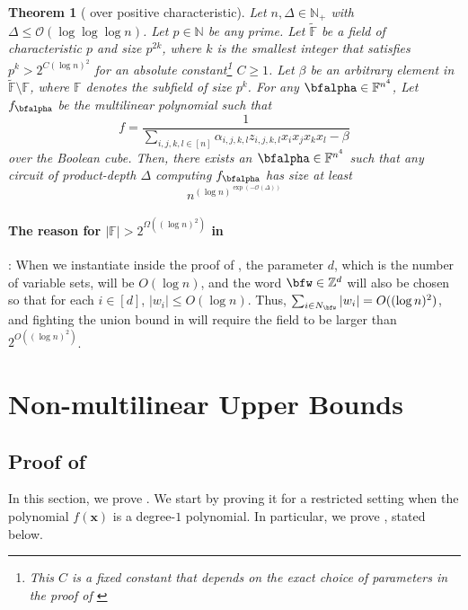 \documentclass[11pt]{article}
\newtheorem{theorem}{Theorem}[section]
\newcommand{\F}{\mathbb{F}}
\begin{document}
\begin{theorem}[\cite{GHT} over positive characteristic]\label{thm: ght positive char}
Let $n, \Delta \in \mathbb{N}_{+}$ with $\Delta \leq \mathcal{O}(\log\log\log n)$. Let $p\in \mathbb{N}$ be any prime. Let $\tilde{\F}$ be a field of characteristic $p$ and size $p^{2k}$, where $k$ is the smallest integer that satisfies $p^k > 2^{C(\log n)^2}$ for an absolute constant\footnote{This $C$ is a fixed constant that depends on the exact choice of parameters in the proof of \cite{GHT}} $C\geq1$. Let $\beta$ be an arbitrary element in $\tilde{\F}\setminus\F$, where $\F$ denotes the subfield of size $p^k$. For any $\bfalpha \in \F^{n^4}$, Let $f_{\bfalpha}$ be the multilinear polynomial such that $$ f = \frac{1}{\sum_{i,j,k,l\in[n]}\alpha_{i,j,k,l}z_{i,j,k,l}x_ix_jx_kx_l - \beta}$$
over the Boolean cube. Then, there exists an $\bfalpha \in \F^{n^4}$ such that any circuit of product-depth $\Delta$ computing $f_{\bfalpha}$ has size at least $$n^{(\log n)^{\exp(-\mathcal{O}(\Delta))}}$$    
\end{theorem}
\paragraph{The reason for $|\F|>2^{\Omega((\log n)^2)}$ in }: When we instantiate  inside the proof of , the parameter $d$, which is the number of variable sets, will be $O(\log n)$, and the word $\bfw \in \mathbb{Z}^d$ will also be chosen so that for each $i\in [d]$, $|w_i|\leq O(\log n)$. Thus, $\sum_{i\in N_\bfw}|w_i| = O((\log n)^2)$, and fighting the union bound in  will require the field to be larger than $2^{O((\log n)^2)}$. 



\section{Non-multilinear Upper Bounds}

\subsection{Proof of }
In this section, we prove . We start by proving it for a restricted setting when the polynomial $f(\mathbf{x})$ is a degree-$1$ polynomial. In particular, we prove , stated below.
\end{document}
